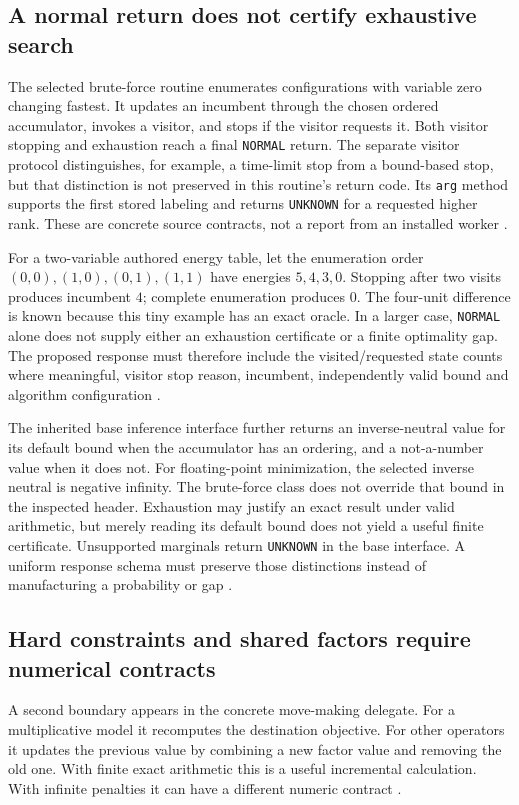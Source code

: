 \subsection{A normal return does not certify exhaustive search}
The selected brute-force routine enumerates configurations with variable
zero changing fastest. It updates an incumbent through the chosen ordered
accumulator, invokes a visitor, and stops if the visitor requests it. Both
visitor stopping and exhaustion reach a final \texttt{NORMAL} return.
The separate visitor protocol distinguishes, for example, a time-limit stop
from a bound-based stop, but that distinction is not preserved in this
routine's return code. Its \texttt{arg} method supports the first stored
labeling and returns \texttt{UNKNOWN} for a requested higher rank. These
are concrete source contracts, not a report from an installed worker
\cite{exec24_opengm_source}.

For a two-variable authored energy table, let the enumeration order
$(0,0),(1,0),(0,1),(1,1)$ have energies $5,4,3,0$. Stopping after two
visits produces incumbent $4$; complete enumeration produces $0$.
The four-unit difference is known because this tiny example has an exact
oracle. In a larger case, \texttt{NORMAL} alone does not supply either an
exhaustion certificate or a finite optimality gap. The proposed response
must therefore include the visited/requested state counts where meaningful,
visitor stop reason, incumbent, independently valid bound and algorithm
configuration \cite{exec24_opengm_choice}.

The inherited base inference interface further returns an inverse-neutral
value for its default bound when the accumulator has an ordering, and a
not-a-number value when it does not. For floating-point minimization,
the selected inverse neutral is negative infinity. The brute-force class
does not override that bound in the inspected header. Exhaustion may justify
an exact result under valid arithmetic, but merely reading its default bound
does not yield a useful finite certificate. Unsupported marginals return
\texttt{UNKNOWN} in the base interface. A uniform response schema must
preserve those distinctions instead of manufacturing a probability or gap
\cite{exec24_opengm_source}.

\subsection{Hard constraints and shared factors require numerical contracts}
A second boundary appears in the concrete move-making delegate. For a
multiplicative model it recomputes the destination objective. For other
operators it updates the previous value by combining a new factor value
and removing the old one. With finite exact arithmetic this is a useful
incremental calculation. With infinite penalties it can have a different
numeric contract \cite{exec24_opengm_source}.

